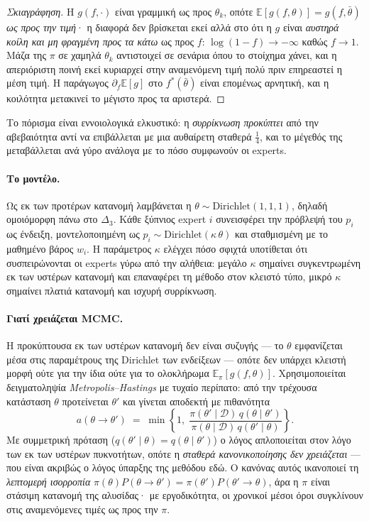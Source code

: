 \documentclass[12pt,a4paper,oneside]{report}
\renewcommand{\_}{\oldunderscore\allowbreak}
\theoremstyle{definition}
\theoremstyle{plain}
\theoremstyle{remark}
\begin{document}
\begin{proof}[Σκιαγράφηση]
Η $g(f,\cdot)$ είναι γραμμική ως προς $\theta_k$, οπότε
$\mathbb{E}[g(f,\theta)] = g(f,\bar{\theta})$ \emph{ως προς την τιμή}· η διαφορά δεν
βρίσκεται εκεί αλλά στο ότι η $g$ είναι \emph{αυστηρά κοίλη και μη φραγμένη προς τα κάτω} ως
προς $f$: $\log(1-f)\to-\infty$ καθώς $f\to1$. Μάζα της $\pi$ σε χαμηλά $\theta_k$
αντιστοιχεί σε σενάρια όπου το στοίχημα χάνει, και η απεριόριστη ποινή εκεί κυριαρχεί στην
αναμενόμενη τιμή πολύ πριν επηρεαστεί η μέση τιμή. Η παράγωγος
$\partial_f \mathbb{E}[g]$ στο $f^{*}(\bar\theta)$ είναι επομένως αρνητική, και η κοιλότητα
μετακινεί το μέγιστο προς τα αριστερά.
\end{proof}

Το πόρισμα είναι εννοιολογικά ελκυστικό: η \emph{συρρίκνωση προκύπτει} από την αβεβαιότητα
αντί να επιβάλλεται με μια αυθαίρετη σταθερά $\tfrac14$, και το μέγεθός της μεταβάλλεται ανά
γύρο ανάλογα με το πόσο συμφωνούν οι experts.

\paragraph{Το μοντέλο.} Ως εκ των προτέρων κατανομή λαμβάνεται η $\theta \sim
\mathrm{Dirichlet}(1,1,1)$, δηλαδή ομοιόμορφη πάνω στο $\Delta_3$. Κάθε ξύπνιος expert $i$
συνεισφέρει την πρόβλεψή του $p_i$ ως ένδειξη, μοντελοποιημένη ως
$p_i \sim \mathrm{Dirichlet}(\kappa\,\theta)$ και σταθμισμένη με το μαθημένο βάρος $w_i$. Η
παράμετρος $\kappa$ ελέγχει πόσο σφιχτά υποτίθεται ότι συσπειρώνονται οι experts γύρω από
την αλήθεια: μεγάλο $\kappa$ σημαίνει συγκεντρωμένη εκ των υστέρων κατανομή και επαναφέρει
τη μέθοδο στον κλειστό τύπο, μικρό $\kappa$ σημαίνει πλατιά κατανομή και ισχυρή συρρίκνωση.

\paragraph{Γιατί χρειάζεται MCMC.} Η προκύπτουσα εκ των υστέρων κατανομή δεν είναι συζυγής
--- το $\theta$ εμφανίζεται μέσα στις παραμέτρους της Dirichlet των ενδείξεων --- οπότε δεν
υπάρχει κλειστή μορφή ούτε για την ίδια ούτε για το ολοκλήρωμα
$\mathbb{E}_{\pi}[g(f,\theta)]$. Χρησιμοποιείται δειγματοληψία
\emph{Metropolis--Hastings} με τυχαίο περίπατο: από την τρέχουσα κατάσταση $\theta$
προτείνεται $\theta'$ και γίνεται αποδεκτή με πιθανότητα
\[
a(\theta\to\theta') \;=\; \min\!\left\{1,\;
\frac{\pi(\theta'\mid\mathcal{D})\,q(\theta\mid\theta')}{\pi(\theta\mid\mathcal{D})\,q(\theta'\mid\theta)}\right\}.
\]
Με συμμετρική πρόταση ($q(\theta'\mid\theta)=q(\theta\mid\theta')$) ο λόγος απλοποιείται στον
λόγο των εκ των υστέρων πυκνοτήτων, οπότε η \emph{σταθερά κανονικοποίησης δεν χρειάζεται} ---
που είναι ακριβώς ο λόγος ύπαρξης της μεθόδου εδώ. Ο κανόνας αυτός ικανοποιεί τη
\emph{λεπτομερή ισορροπία} $\pi(\theta)P(\theta\to\theta') = \pi(\theta')P(\theta'\to\theta)$,
άρα η $\pi$ είναι στάσιμη κατανομή της αλυσίδας· με εργοδικότητα, οι χρονικοί μέσοι όροι
συγκλίνουν στις αναμενόμενες τιμές ως προς την $\pi$.
\end{document}
